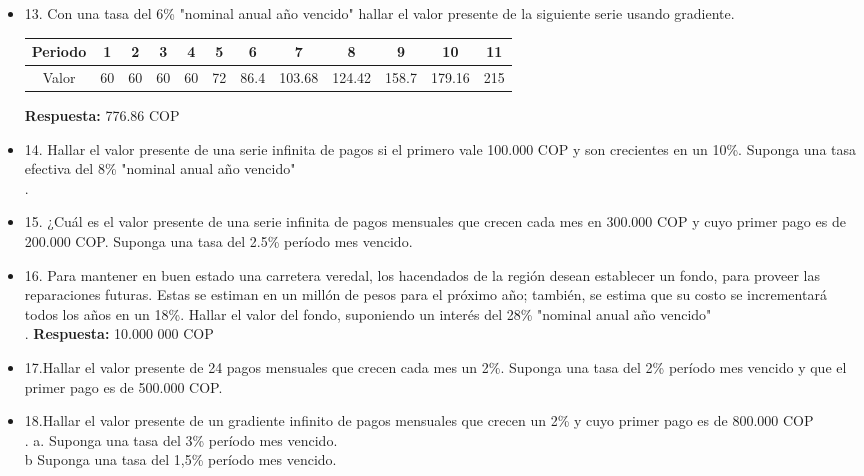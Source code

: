 \begin{itemize}
 \item 13. Con una tasa del 6\% "nominal anual año vencido" hallar el valor presente de la siguiente serie usando gradiente.\\
      \begin{center}
            \begin{tabular}{|c|c|c|c|c|c|c|c|c|c|c|c|}
            \hline
            Periodo & 1 & 2 & 3 & 4 & 5 & 6 & 7 & 8 & 9 & 10 & 11 \\ \hline
            Valor & 60 & 60 & 60 & 60 & 72 & 86.4 & 103.68 & 124.42 & 158.7 & 179.16 & 215  \\ \hline
            \end{tabular}
      \end{center}
       \textbf{Respuesta:}  776.86 COP\\
       \medskip

 \item 14. Hallar el valor presente de una serie infinita de pagos si el primero vale  100.000 COP y son crecientes en un 10\%. Suponga una tasa efectiva del 8\% "nominal anual año vencido"\\.
       \medskip

 \item 15. ¿Cuál es el valor presente de una serie infinita de pagos mensuales que crecen cada mes en  300.000 COP y cuyo primer pago es de  200.000 COP. Suponga una tasa del 2.5\% período mes vencido.\\
       \medskip

 \item 16. Para mantener en buen estado una carretera veredal, los hacendados de la región desean establecer un fondo, para proveer las reparaciones futuras. Estas se estiman en un millón de pesos para el próximo año; también, se estima que su costo se incrementará todos los años en un 18\%. Hallar el valor del fondo, suponiendo un interés del 28\% "nominal anual año vencido"\\.
       \textbf{Respuesta:}  10.000 000 COP\\
       \medskip

 \item 17.Hallar el valor presente de 24 pagos mensuales que crecen cada mes un 2\%. Suponga una tasa del 2\% período mes vencido y que el primer pago es de 500.000 COP.\\
       \medskip

 \item 18.Hallar el valor presente de un gradiente infinito de pagos mensuales que crecen un 2\% y cuyo primer pago es de  800.000 COP\\.
       a. Suponga una tasa del 3\% período mes vencido.\\
       b Suponga una tasa del 1,5\% período mes vencido.\\
       \medskip


\end{itemize}

